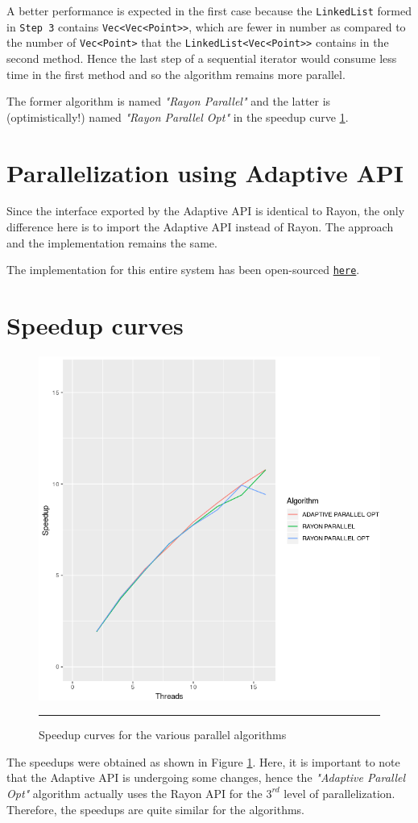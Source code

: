 A better performance is expected in the first case because the \texttt{LinkedList} formed in \texttt{Step 3} contains \texttt{Vec<Vec<Point>>}, which are fewer in number as compared to the number of \texttt{Vec<Point>} that the \texttt{LinkedList<Vec<Point>>} contains in the second method. Hence the last step of a sequential iterator would consume less time in the first method and so the algorithm remains more parallel.


The former algorithm is named \emph{"Rayon Parallel"} and the latter is (optimistically!) named \emph{"Rayon Parallel Opt"} in the speedup curve \ref{fig:speedups}.
\section{Parallelization using Adaptive API}
Since the interface exported by the Adaptive API is identical to Rayon, the only difference here is to import the Adaptive API instead of Rayon. The approach and the implementation remains the same.

The implementation for this entire system has been open-sourced \href{https://github.com/smr97/insitu\_analytics/tree/master/src}{\texttt{here}}.

\section{Speedup curves}
\begin{figure}%
	\centering
    \includegraphics[scale=0.6]{Pictures/speedups.png}
	\rule{40em}{0.5pt}
    \caption[Optimization]{Speedup curves for the various parallel algorithms}
	\label{fig:speedups}
\end{figure}
The speedups were obtained as shown in Figure \ref{fig:speedups}. Here, it is important to note that the Adaptive API is undergoing some changes, hence the \emph{"Adaptive Parallel Opt"} algorithm actually uses the Rayon API for the $3^{rd}$ level of parallelization. Therefore, the speedups are quite similar for the algorithms.
